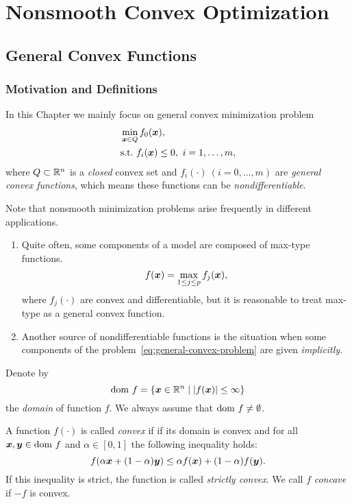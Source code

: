 \chapter{Nonsmooth Convex Optimization}\label{chap:nonsmooth_convex_opt}

\newpage
\section{General Convex Functions}\label{sec:general-convex-funcs}
\subsection{Motivation and Definitions}
In this Chapter we mainly focus on general convex minimization problem
\begin{equation}\label{eq:general-convex-problem}
    \begin{aligned}
        &\min_{\bm{x} \in Q} f_0(\bm{x}) ,\\
        &\text{s.t.}~ f_i(\bm{x}) \le 0,~i = 1, \dots, m,
    \end{aligned}
\end{equation}
where \(Q \subset \mathbb{R}^n\) is a \emph{closed} convex set and \(f_i(\cdot)~(i=0,\dots,m)\) are
\emph{general convex functions}, which means these functions can be \emph{nondifferentiable}.

Note that nonsmooth minimization problems arise frequently in different applications. 
\begin{enumerate}
    \item {
        Quite often, some components of a model are composed of max-type functions.
        \[
            f(\bm{x}) = \max_{1 \le j \le p} f_j (\bm{x}),  
        \]
        where \(f_j(\cdot)\) are convex and differentiable, but it is reasonable to treat max-type as a
        general convex function.
    }
    \item {
        Another source of nondifferentiable functions is the situation when some components of the problem~\ref{eq:general-convex-problem}
        are given \emph{implicitly}.
    }
\end{enumerate}
    
\begin{defn}
    Denote by 
    \[
        \mathrm{dom}~ f = \{\bm{x} \in \mathbb{R}^n \mid \abs{f(\bm{x})} \le \infty\}
    \]
    the \emph{domain} of function \(f\). We always assume that \(\mathrm{dom}~ f \ne \emptyset\).
\end{defn}

\begin{defn}[Convex]\label{defn:general-convex}
    A function \(f(\cdot)\) is called \emph{convex} if if its domain is convex and for all \(\bm{x}, \bm{y} \in \mathrm{dom}~ f\)
    and \(\alpha \in [0, 1]\) the following inequality holds:
    \begin{equation}
        f(\alpha \bm{x} + (1 - \alpha) \bm{y}) \le \alpha f(\bm{x}) + (1 - \alpha) f(\bm{y}).
    \end{equation}
    If this inequality is strict, the function is called \emph{strictly convex}. We call \(f\) \emph{concave} if \(-f\)
    is convex.
\end{defn}

